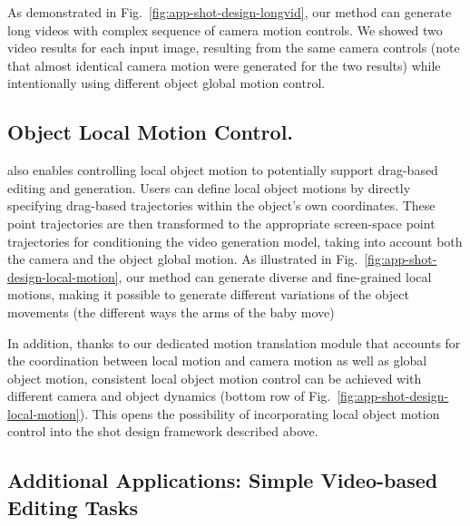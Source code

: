 As demonstrated in Fig.~\ref{fig:app-shot-design-longvid}, our method can generate long videos with complex sequence of camera motion controls. We showed two video results for each input image, resulting from the same camera controls (note that almost identical camera motion were generated for the two results) while intentionally using different object global motion control.


\subsection{Object Local Motion Control.}

\MOCA also enables controlling local object motion to potentially support drag-based editing and generation. 
Users can define local object motions by directly specifying drag-based trajectories within the object's own coordinates. These point trajectories are then transformed to the appropriate screen-space point trajectories for conditioning the video generation model, taking into account both the camera and the object global motion. 
As illustrated in Fig.~\ref{fig:app-shot-design-local-motion}, our method can generate diverse and fine-grained local motions, making it possible to generate different variations of the object movements (\eg the different ways the arms of the baby move)

In addition, thanks to our dedicated motion translation module that accounts for the coordination between local motion and camera motion as well as global object motion,
consistent local object motion control can be achieved with different camera and object dynamics (bottom row of Fig.~\ref{fig:app-shot-design-local-motion}). This opens the possibility of incorporating local object motion control into the shot design framework described above.


\subsection{Additional Applications: Simple Video-based Editing Tasks}

